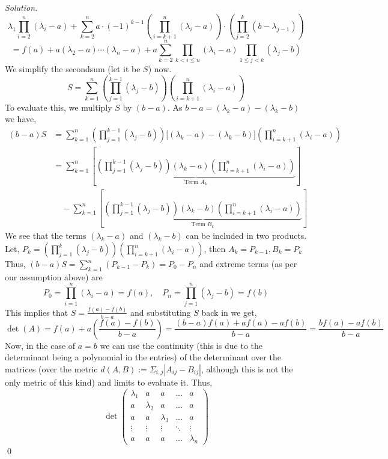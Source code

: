 \documentclass[12pt,a4paper]{article}
\newenvironment{solution}{%
  \par\noindent\textit{Solution.}\ }{\qed}
\theoremstyle{problemstyle}
\begin{document}
\begin{solution}
$$\lambda_1\prod_{i=2}^{n}(\lambda_i-a)+\sum_{k=2}^na\cdot(-1)^{k-1}\left(\prod_{i=k+1}^n(\lambda_i-a)\right)\cdot\left(\prod_{j=2}^k(b-\lambda_{j-1})\right)$$
$$=f(a)+a(\lambda_2-a)\cdots(\lambda_n-a)+a\sum_{k=2}^n\prod_{k<i\leq n}(\lambda_i-a)\prod_{1\leq j<k}(\lambda_j-b)$$
We simplify the secondsum (let it be $S$) now. 
$$S = \sum_{k=1}^n \left( \prod_{j=1}^{k-1} (\lambda_j - b) \right) \left( \prod_{i=k+1}^n (\lambda_i - a) \right)$$
To evaluate this, we multiply $S$ by $(b-a)$. As $b-a = (\lambda_k - a) - (\lambda_k - b)$ we have,
\begin{align*}
(b-a)S &= \sum_{k=1}^n \left( \prod_{j=1}^{k-1} (\lambda_j - b) \right) \Big[ (\lambda_k - a) - (\lambda_k - b) \Big] \left( \prod_{i=k+1}^n (\lambda_i - a) \right) \\
&= \sum_{k=1}^n \left[ \underbrace{\left( \prod_{j=1}^{k-1} (\lambda_j - b) \right) (\lambda_k - a) \left( \prod_{i=k+1}^n (\lambda_i - a) \right)}_{\text{Term } A_k} \right] \\
&\quad - \sum_{k=1}^n \left[ \underbrace{\left( \prod_{j=1}^{k-1} (\lambda_j - b) \right) (\lambda_k - b) \left( \prod_{i=k+1}^n (\lambda_i - a) \right)}_{\text{Term } B_k} \right]
\end{align*}
We see that the terms $(\lambda_k - a)$ and $(\lambda_k - b)$ can be included in two products. 
Let, $P_k = \left( \prod_{j=1}^{k} (\lambda_j - b) \right) \left( \prod_{i=k+1}^n (\lambda_i - a) \right)$, then $A_k=P_{k-1},B_k=P_k$
Thus, $(b-a)S = \sum_{k=1}^n (P_{k-1} - P_k) = P_0 - P_n$ and extreme terms (as per our assumption above) are 
$$P_0 = \prod_{i=1}^n (\lambda_i - a) = f(a), \quad P_n = \prod_{j=1}^n (\lambda_j - b) = f(b)$$
This implies that $S = \frac{f(a) - f(b)}{b-a}$ and substituting $S$ back in we get, 
$$\det(A) = f(a) + a \left( \frac{f(a) - f(b)}{b-a} \right) = \frac{(b-a)f(a) + af(a) - af(b)}{b-a} = \frac{bf(a) - af(b)}{b-a}$$
Now, in the case of $a=b$ we can use the continuity (this is due to the determinant being a polynomial in the entries) of the determinant over the matrices (over the metric $d(A,B):=\Sigma_{i,j}|A_{ij}-B_{ij}|$, although this is not the only metric of this kind) and limits to evaluate it. 
Thus,
$$\det\begin{pmatrix}
    \lambda_1 & a & a & \dots & a \\
    a & \lambda_2 & a & \dots & a \\
    a & a & \lambda_3 & \dots & a \\
    \vdots & \vdots & \vdots & \ddots & \vdots \\
    a & a & a & \dots & \lambda_n

\end{pmatrix}$$
\end{solution}
\end{document}
